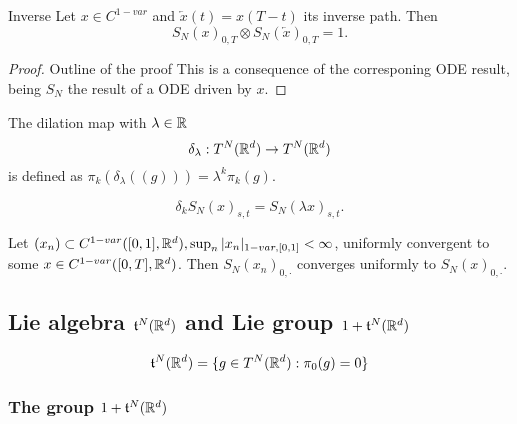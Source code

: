\begin{proposition}{Inverse}
    Let \(x \in C^{1-var}\) and \(\overleftarrow{x}(t) = x(T-t)\) its inverse path. Then
    \begin{equation}
        S_N(x)_{0,T} \otimes S_N(\overleftarrow{x})_{0,T} = 1.
    \end{equation} 
\end{proposition}
\begin{proof}{Outline of the proof}
    This is a consequence of the corresponing ODE result, being \(S_N\) the result of a ODE driven by \(x\).
\end{proof}

\begin{definition}[Dilation]
    The dilation map with \(\lambda \in \mathbb{R}\)
    \begin{equation}
        \delta_\lambda:T^N(\mathbb{R}^d) \rightarrow T^N(\mathbb{R}^d)
    \end{equation}
    is defined as \(\pi_k(\delta_\lambda((g))) = \lambda^k \pi_k(g).\)
\end{definition}

\begin{example}
    \begin{equation}
        \delta_k S_N(x)_{s,t} = S_N(\lambda x)_{s,t}.
    \end{equation}
\end{example}

\begin{proposition}
    Let \((x_n) \subset C^{1-var}([0,1],\mathbb{R}^d), \sup_n |x_n|_{1-var,[0,1]} < \infty\), uniformly convergent to some \(x \in C^{1-var}([0,T],\mathbb{R}^d)\).
    Then \(S_N(x_n)_{0,\cdot}\) converges uniformly to \(S_N(x)_{0,\cdot}\).
\end{proposition}

\subsection{Lie algebra \(\mathfrak{t}^N(\mathbb{R}^d)\) and Lie group \(1 + \mathfrak{t}^N(\mathbb{R}^d)\)}

\begin{definition}
    \begin{equation}
        \mathfrak{t}^N(\mathbb{R}^d) = \{ g \in T^N(\mathbb{R}^d): \pi_0(g) = 0 \}
    \end{equation}
\end{definition}

\subsubsection{The group \(1 + \mathfrak{t}^N(\mathbb{R}^d)\)}

